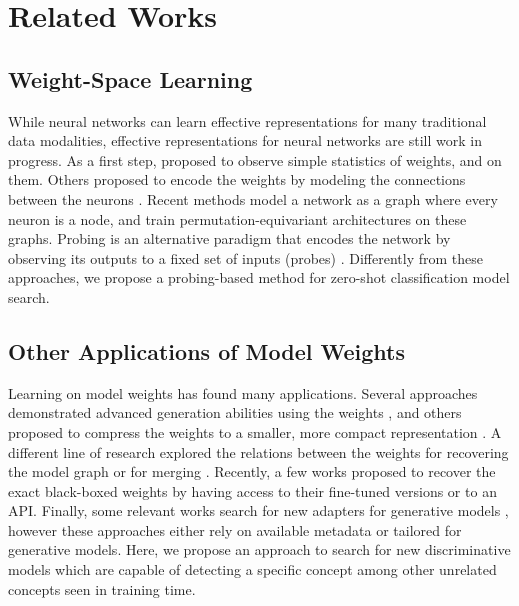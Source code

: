 \section{Related Works}
\label{sec:related_works}

\subsection{Weight-Space Learning}

While neural networks can learn effective representations for many traditional data modalities, effective representations for neural networks are still work in progress. As a first step, \citet{statnn} proposed to observe simple statistics of weights, and  \citep{ke2017lightgbm} on them. Others proposed to encode the weights by modeling the connections between the neurons \citep{dws,inr2vec,sane,hyper_repr,eilertsen2020classifying,lim_lol,prem_neural_functionals,tran2024equivariant,functa,probex}. Recent methods \citep{neural_graphs,neural_functional_transformers,graph_meta,kalogeropoulos2024scale} model a network as a graph where every neuron is a node, and train permutation-equivariant architectures \citep{gilmer2017neural,kipf2016semi,attentionisallyouneed,relationalattention} on these graphs.
Probing is an alternative paradigm that encodes the network by observing its outputs to a fixed set of inputs (probes)  \citep{probegen,non_interactive,carlini2024stealing,tahan2024label,choshen2022start,neural_graphs,huang2024lg,dravid2023rosetta,bau2017network}. Differently from these approaches, we propose a probing-based method for zero-shot classification model search.

\subsection{Other Applications of Model Weights}

Learning on model weights has found many applications. Several approaches demonstrated advanced generation abilities using the weights \citep{dravid2024interpreting,erkocc2023hyperdiffusion,dravid2024interpreting,shah2023ziplora}, and others proposed to compress the weights to a smaller, more compact representation \citep{ha2016hypernetworks,nern,peebles2022learning}. A different line of research explored the relations between the weights for recovering the model graph \citep{mother,yax2025phylolm} or for merging \citep{yadav2024ties,gueta2023knowledge,izmailov2018averaging,wortsman2022model,rame2023model}. Recently, a few works proposed to recover the exact black-boxed weights \citep{spectral_detuning,carlini2024stealing} by having access to their fine-tuned versions or to an API. Finally, some relevant works search for new adapters for generative models \citep{hugginggpt,stylus,contentsearch}, however these approaches either rely on available metadata or tailored for generative models. Here, we propose an approach to search for new discriminative models which are capable of detecting a specific concept among other unrelated concepts seen in training time.